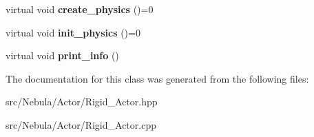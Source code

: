 \begin{DoxyCompactItemize}
\item 
\hypertarget{classNeb_1_1Actor_1_1RigidActor_a9aeda58149838be324376f1e42eeb7de}{virtual void {\bfseries create\-\_\-physics} ()=0}\label{classNeb_1_1Actor_1_1RigidActor_a9aeda58149838be324376f1e42eeb7de}

\item 
\hypertarget{classNeb_1_1Actor_1_1RigidActor_a2a352164825bab033a917ccb224acaf1}{virtual void {\bfseries init\-\_\-physics} ()=0}\label{classNeb_1_1Actor_1_1RigidActor_a2a352164825bab033a917ccb224acaf1}

\item 
\hypertarget{classNeb_1_1Actor_1_1RigidActor_ac2d9884ccfd06459285738272879f622}{virtual void {\bfseries print\-\_\-info} ()}\label{classNeb_1_1Actor_1_1RigidActor_ac2d9884ccfd06459285738272879f622}

\end{DoxyCompactItemize}


\-The documentation for this class was generated from the following files\-:\begin{DoxyCompactItemize}
\item 
src/\-Nebula/\-Actor/\-Rigid\-\_\-\-Actor.\-hpp\item 
src/\-Nebula/\-Actor/\-Rigid\-\_\-\-Actor.\-cpp\end{DoxyCompactItemize}
